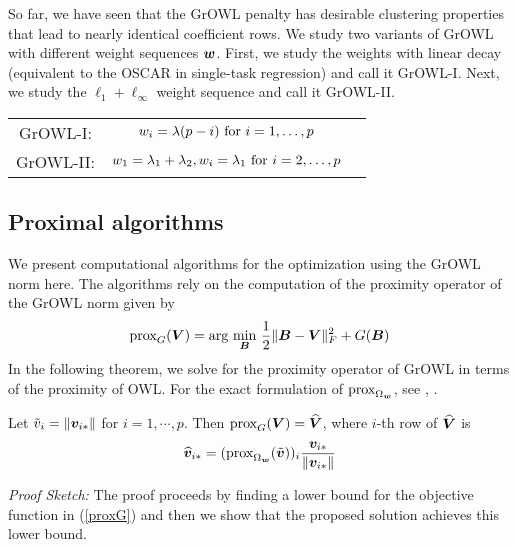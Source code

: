 So far, we have seen that the GrOWL penalty has desirable clustering properties that lead
to nearly identical coefficient rows. We study two variants of GrOWL with different weight
sequences $\boldsymbol{w}$. First, we study the weights with linear decay (equivalent to the OSCAR in
single-task regression) and call it GrOWL-I. Next, we study the $\ell_1 +\ell_{\infty}$
weight sequence and call it GrOWL-II.


    \begin{tabular}[b]{ccc}
    \hline
    	GrOWL-I:	& $w_i = \lambda (p - i) \textnormal{ for } i = 1, \dots,  p $   &\\ 
	GrOWL-II:	& $w_1 = \lambda_1 +  \lambda_2, w_i = \lambda_1 \textnormal{ for } i = 2, \dots,  p$  &\\ \hline
	    \end{tabular}


    




\subsection{Proximal algorithms}
We present computational algorithms for the optimization using the GrOWL norm here. The algorithms rely on the computation of the proximity operator \cite{prox} of the GrOWL norm given by
\begin{eqnarray}\label{proxG}
\textnormal{prox}_{G}(\bV) = \textnormal{arg} \underset{\bB}{ \textnormal{ min } } \frac{1}{2}\|\bB - \bV\|_F^2 + G(\bB) 
\end{eqnarray}
In the following theorem, we solve for the proximity operator of GrOWL in terms of the proximity of OWL. For the exact formulation of $\textnormal{prox}_{\Omega_{\boldsymbol{w}}}$, see \cite{candes13}, \cite{ZengFigueiredo2014}.

\begin{theorem} Let $\tilde{v}_i = \| \boldsymbol{v}_{i {\ast}}\|$ for $i = 1, \cdots, p$. Then
$\textnormal{prox}_{G}(\boldsymbol{V}) = \widehat {\boldsymbol{V}}$, where $i$-th row of $\widehat {\boldsymbol{V}}$ is
\begin{eqnarray}\label{Vhat}
\widehat \bv_{i \a} =  (\textnormal{prox}_{\Omega_{\bw}}(\tilde{\bv}))_i \frac{\bv_{i\a}}{\|\bv_{i \a}\|}
\end{eqnarray}
\end{theorem}
\textit{Proof Sketch:} The proof proceeds by finding a lower bound for the objective function in (\ref{proxG}) and then we show that the proposed solution achieves this lower bound.




